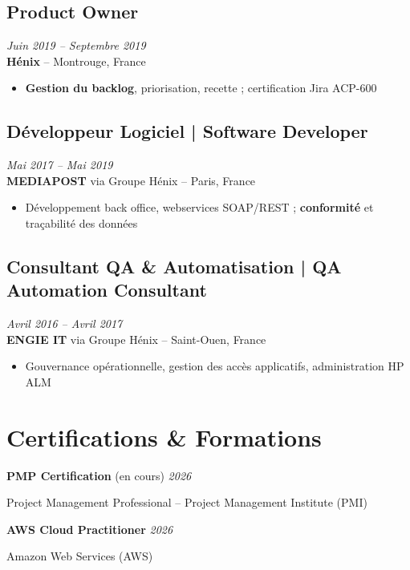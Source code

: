 \documentclass[11pt,a4paper]{article}
\begin{document}
\subsection*{Product Owner} \hfill \textit{Juin 2019 -- Septembre 2019}\\
\textbf{Hénix} -- Montrouge, France\\
\begin{itemize}
    \item \textbf{Gestion du backlog}, priorisation, recette ; certification Jira ACP-600
\end{itemize}

\subsection*{Développeur Logiciel | Software Developer} \hfill \textit{Mai 2017 -- Mai 2019}\\
\textbf{MEDIAPOST} via Groupe Hénix -- Paris, France\\
\begin{itemize}
    \item Développement back office, webservices SOAP/REST ; \textbf{conformité} et traçabilité des données
\end{itemize}

\subsection*{Consultant QA \& Automatisation | QA Automation Consultant} \hfill \textit{Avril 2016 -- Avril 2017}\\
\textbf{ENGIE IT} via Groupe Hénix -- Saint-Ouen, France\\
\begin{itemize}
    \item Gouvernance opérationnelle, gestion des accès applicatifs, administration HP ALM
\end{itemize}

\section*{Certifications \& Formations}

\textbf{PMP Certification} (en cours) \hfill \textit{2026}

Project Management Professional -- Project Management Institute (PMI)

\textbf{AWS Cloud Practitioner} \hfill \textit{2026}

Amazon Web Services (AWS)
\end{document}
